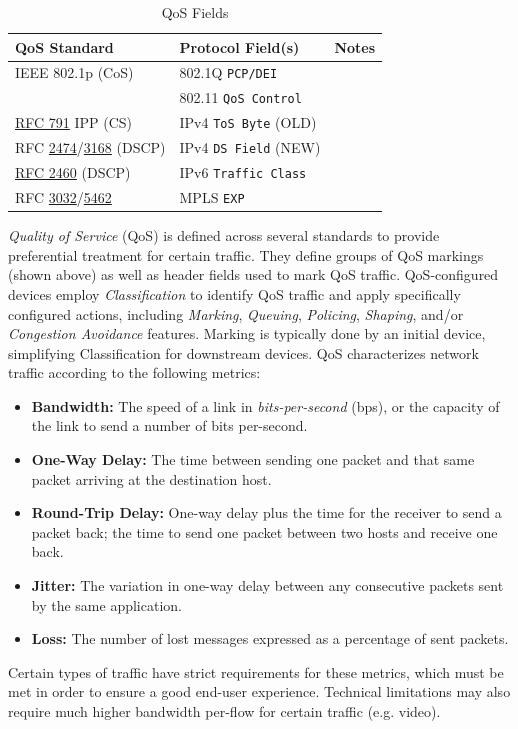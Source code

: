 \documentclass[12pt]{article}
\newcommand{\rfc}[1]{\href{https://datatracker.ietf.org/doc/html/rfc#1}{#1}}
\newcommand{\RFC}[1]{\href{https://datatracker.ietf.org/doc/html/rfc#1}{RFC #1}}
\newcommand{\mr}[2]{\multirow{#1}{*}{#2}}
\begin{document}
	\begin{table}[H]
	\centering
	\caption{QoS Fields \label{tab:QOS FIELDS}}
	\begin{tabular}{@{} l l r @{}}\hline
	\textbf{QoS Standard} 			& \textbf{Protocol Field(s)}		& \textbf{Notes}\\\hline
	IEEE 802.1p (CoS)				& 802.1Q \texttt{PCP/DEI} 		& \Cref{tab:802.1Q}\\\hline
							& 802.11 \texttt{QoS Control} 		& \Cref{subsec:802.11 WLANS}\\\hline
	\RFC{791} IPP (CS)			& IPv4 \texttt{ToS Byte} (OLD) 	& \mr{2}{\Cref{subsec:IPV4}}\\
	RFC \rfc{2474}/\rfc{3168} (DSCP)	& IPv4 \texttt{DS Field} (NEW) 	&\\\hline
	\RFC{2460} (DSCP)			& IPv6 \texttt{Traffic Class} 		& \Cref{subsec:IPV6}\\\hline
	RFC \rfc{3032}/\rfc{5462}		& MPLS \texttt{EXP}			& \Cref{sec:MPLS}\\\hline
	\end{tabular}\end{table}
	\textit{Quality of Service} (QoS) is defined across several standards to provide preferential treatment for certain traffic. They define groups of QoS markings (shown above) as well as header fields used to mark QoS traffic. QoS-configured devices employ \textit{Classification} to identify QoS traffic and apply specifically configured actions, including \textit{Marking}, \textit{Queuing}, \textit{Policing}, \textit{Shaping}, and/or \textit{Congestion Avoidance} features. Marking is typically done by an initial device, simplifying Classification for downstream devices. QoS characterizes network traffic according to the following metrics:

	\begin{itemize}
		\label{itm:QOS METRICS}
		\item{\textbf{Bandwidth:} The speed of a link in \textit{bits-per-second} (bps), or the capacity of the link to send a number of bits per-second.}
		\item{\textbf{One-Way Delay:} The time between sending one packet and that same packet arriving at the destination host.}
		\item{\textbf{Round-Trip Delay:} One-way delay plus the time for the receiver to send a packet back; the time to send one packet between two hosts and receive 					one back.}
		\item{\textbf{Jitter:} The variation in one-way delay between any consecutive packets sent by the same application.}
		\item{\textbf{Loss:} The number of lost messages expressed as a percentage of sent packets.}
	\end{itemize}
	Certain types of traffic have strict requirements for these metrics, which must be met in order to ensure a good end-user experience. Technical limitations may also require much higher bandwidth per-flow for certain traffic (e.g. video).
	
\end{document}

